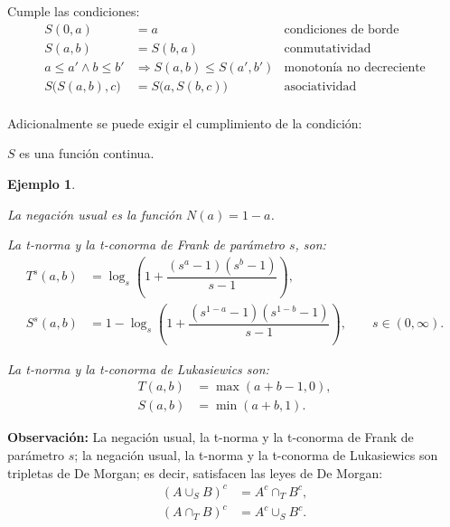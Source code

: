 \documentclass[a5paper,doc,10pt,noapacite]{apa6}
\newtheorem{ejem}{Ejemplo}
\begin{document}
{{Cumple las condiciones:
\begin{align*}
	S(0,a) &= a 		&	\text{condiciones de borde}	\\
	S(a,b) &= S(b,a) 	&	\text{conmutatividad}			\\
	a \leq a' \wedge b \leq b' &\Rightarrow S(a,b) \leq S(a',b')	&	\text{monotonía no decreciente}			\\
	S\big(S(a,b),c\big) &= S\big(a, S(b,c)\big)	&		\text{asociatividad}			\\
\end{align*}
 
Adicionalmente se puede exigir el cumplimiento de la condición:

\begin{center}
	\(S\) es una función continua.
\end{center}

\newpage
\begin{ejem}

\begin{APAenumerate}
    \item La negación usual es la función \(N(a)=1-a\).
    \item La t-norma y la t-conorma de Frank de parámetro \(s\), son:
    \begin{align*}
    	T^s(a,b) & = \log _s \left(1+\dfrac{(s^a -1)(s^b-1)}{s-1}\right),			\\	
    	S^s(a,b) & = 1- \log _s \left(1+\dfrac{(s^{1-a} -1)(s^{1-b}-1)}{s-1}\right), 	\qquad s \in (0,\infty).
    \end{align*}

    \item La t-norma y la t-conorma de Lukasiewics son:
    \begin{align*}
    	T(a,b) & = \max (a+b-1,0),		\\
    	S(a,b) & = \min (a+b,1).
    \end{align*}    
    
\end{APAenumerate}
\end{ejem}

\textbf{Observación:} La negación usual, la t-norma y la t-conorma de Frank de parámetro \(s\); la negación usual, la t-norma y la t-conorma de Lukasiewics son tripletas de De Morgan; es decir, satisfacen las leyes de De Morgan:
\begin{align*}
	(A \cup_S B)^c &= A^c \cap_T B^c	,
	\\
	(A \cap_T B)^c &= A^c \cup_S B^c	.
\end{align*}

}}
\end{document}
